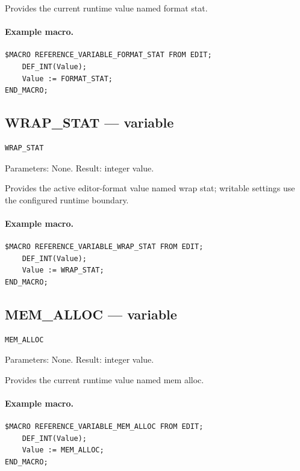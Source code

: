 \documentclass[a4paper,10pt,twoside,openany]{book}
\begin{document}
Provides the current runtime value named format stat.

\paragraph{Example macro.}
\begin{verbatim}
$MACRO REFERENCE_VARIABLE_FORMAT_STAT FROM EDIT;
    DEF_INT(Value);
    Value := FORMAT_STAT;
END_MACRO;
\end{verbatim}

\label{prim:variable-wrap-stat}
\subsection*{WRAP\_STAT --- variable}
\begin{verbatim}
WRAP_STAT
\end{verbatim}
Parameters: None. Result: integer value.

Provides the active editor-format value named wrap stat; writable settings use the configured runtime boundary.

\paragraph{Example macro.}
\begin{verbatim}
$MACRO REFERENCE_VARIABLE_WRAP_STAT FROM EDIT;
    DEF_INT(Value);
    Value := WRAP_STAT;
END_MACRO;
\end{verbatim}

\label{prim:variable-mem-alloc}
\subsection*{MEM\_ALLOC --- variable}
\begin{verbatim}
MEM_ALLOC
\end{verbatim}
Parameters: None. Result: integer value.

Provides the current runtime value named mem alloc.

\paragraph{Example macro.}
\begin{verbatim}
$MACRO REFERENCE_VARIABLE_MEM_ALLOC FROM EDIT;
    DEF_INT(Value);
    Value := MEM_ALLOC;
END_MACRO;
\end{verbatim}
\end{document}
